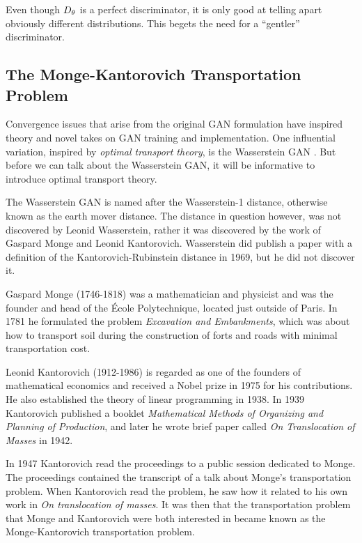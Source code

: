 \begin{remark} Even though $D_\theta$ is a perfect discriminator, it is only
  good at telling apart obviously different distributions. This begets
  the need for a ``gentler'' discriminator.
\end{remark}

\subsection{The Monge-Kantorovich Transportation Problem}

Convergence issues that arise from the original GAN formulation have
inspired theory and novel takes on GAN training and
implementation. One influential variation, inspired by \textit{optimal
  transport theory}, is the Wasserstein GAN
\cite{ref:arjovsky-2017}. But before we can talk about the Wasserstein
GAN, it will be informative to introduce optimal transport theory.

The Wasserstein GAN is named after the Wasserstein-1 distance,
otherwise known as the earth mover distance. The distance in question
however, was not discovered by Leonid Wasserstein, rather it was
discovered by the work of Gaspard Monge and Leonid
Kantorovich. Wasserstein did publish a paper with a definition of the
Kantorovich-Rubinstein distance in 1969, but he did not discover it.

Gaspard Monge (1746-1818) was a mathematician and physicist and was
the founder and head of the \'Ecole Polytechnique, located just
outside of Paris. In 1781 he formulated the problem \textit{Excavation
  and Embankments}, which was about how to transport soil during the
construction of forts and roads with minimal transportation cost.

Leonid Kantorovich (1912-1986) is regarded as one of the founders of
mathematical economics and received a Nobel prize in 1975 for his
contributions.  He also established the theory of linear programming
in 1938. In 1939 Kantorovich published a booklet \textit{Mathematical
  Methods of Organizing and Planning of Production}, and later he wrote
brief paper called \textit{On Translocation of Masses} in 1942.

In 1947 Kantorovich read the proceedings to a public session dedicated
to Monge.  The proceedings contained the transcript of a talk about
Monge's transportation problem. When Kantorovich read the problem, he
saw how it related to his own work in \textit{On translocation of
  masses}. It was then that the transportation problem that Monge and
Kantorovich were both interested in became known as the
Monge-Kantorovich transportation problem.

